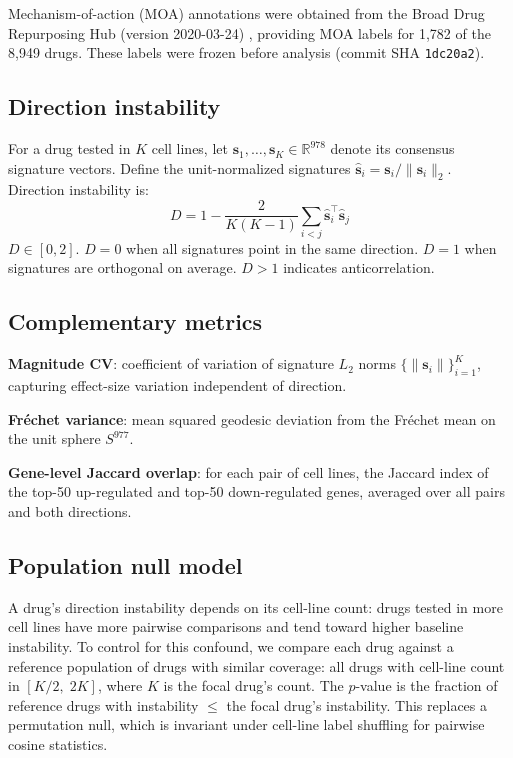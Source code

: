 \documentclass{article}
\begin{document}
Mechanism-of-action (MOA) annotations were obtained from the Broad Drug
Repurposing Hub (version 2020-03-24) \citep{corsello2017drug}, providing
MOA labels for 1{,}782 of the 8{,}949 drugs. These labels were frozen
before analysis (commit SHA \texttt{1dc20a2}).

\subsection{Direction instability}

For a drug tested in $K$ cell lines, let $\mathbf{s}_1, \ldots,
\mathbf{s}_K \in \mathbb{R}^{978}$ denote its consensus signature vectors.
Define the unit-normalized signatures $\hat{\mathbf{s}}_i =
\mathbf{s}_i / \|\mathbf{s}_i\|_2$. Direction instability is:
\begin{equation}
  D = 1 - \frac{2}{K(K-1)} \sum_{i < j}
    \hat{\mathbf{s}}_i^\top \hat{\mathbf{s}}_j
  \label{eq:direction_instability}
\end{equation}
$D \in [0, 2]$. $D = 0$ when all signatures point in the same direction.
$D = 1$ when signatures are orthogonal on average. $D > 1$ indicates
anticorrelation.

\subsection{Complementary metrics}

\textbf{Magnitude CV}: coefficient of variation of signature $L_2$ norms
$\{\|\mathbf{s}_i\|\}_{i=1}^K$, capturing effect-size variation independent
of direction.

\textbf{Fr\'echet variance}: mean squared geodesic deviation from the
Fr\'echet mean on the unit sphere $S^{977}$.

\textbf{Gene-level Jaccard overlap}: for each pair of cell lines, the
Jaccard index of the top-50 up-regulated and top-50 down-regulated genes,
averaged over all pairs and both directions.

\subsection{Population null model}

A drug's direction instability depends on its cell-line count: drugs tested
in more cell lines have more pairwise comparisons and tend toward higher
baseline instability. To control for this confound, we compare each drug
against a reference population of drugs with similar coverage: all drugs
with cell-line count in $[K/2,\; 2K]$, where $K$ is the focal drug's count.
The $p$-value is the fraction of reference drugs with instability $\leq$
the focal drug's instability. This replaces a permutation null, which
is invariant under cell-line label shuffling for pairwise cosine statistics.
\end{document}
